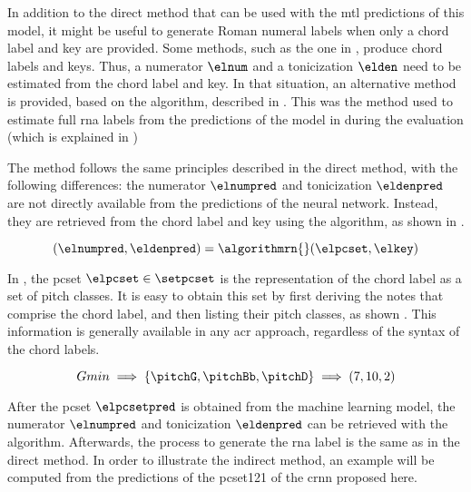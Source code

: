 
In addition to the direct method that can be used with the
\gls{mtl} predictions of this model, it might be useful to
generate Roman numeral labels when only a chord label and
key are provided. Some methods, such as the one in
\textcite{mcleod2021modular}, produce chord labels and keys.
Thus, a numerator $\elnum$ and a tonicization $\elden$ need
to be estimated from the chord label and key. In that
situation, an alternative method is provided, based on the
\algorithmrn{} algorithm, described in
.
This was the method used to estimate full \gls{rna} labels
from the predictions of the model in
\textcite{mcleod2021modular, chen2021attend} during the
evaluation (which is explained in
)

The method follows the same principles described in the
direct method, with the following differences: the numerator
$\elnumpred$ and tonicization $\eldenpred$ are not directly
available from the predictions of the neural network.
Instead, they are retrieved from the chord label and key
using the \algorithmrn{} algorithm, as shown in
.

\begin{equation}
    \label{eq:calling_natem}
    (\elnumpred, \eldenpred) = \algorithmrn{}(\elpcset, \elkey) 
\end{equation}

In , the \gls{pcset} $\elpcset \in
\setpcset$ is the representation of the chord label as a set
of pitch classes. It is easy to obtain this set by first
deriving the notes that comprise the chord label, and then
listing their pitch classes, as shown
. This information is generally
available in any \gls{acr} approach, regardless of the
syntax of the chord labels.


\begin{equation}
    \label{eq:indirect_method_pcset}
    Gmin \implies \{\pitchG, \pitchBb, \pitchD\} \implies (7, 10, 2)
\end{equation} 

After the \gls{pcset} $\elpcsetpred$ is obtained from the
machine learning model, the numerator $\elnumpred$ and
tonicization $\eldenpred$ can be retrieved with the
\algorithmrn{} algorithm. Afterwards, the process to
generate the \gls{rna} label is the same as in the direct
method. In order to illustrate the indirect method, an
example will be computed from the predictions of the
\gls{pcset121} of the \gls{crnn} proposed here.

